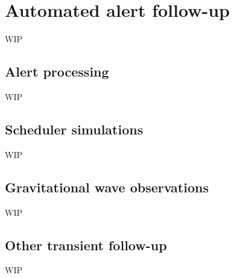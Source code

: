 
\newpage
\section{Automated alert follow-up}
\label{sec:followup}
\begin{colsection}


\begin{colsection}

WIP

\end{colsection}


\subsection{Alert processing}
\label{sec:alerts}
\begin{colsection}

WIP

\end{colsection}


\subsection{Scheduler simulations}
\label{sec:simulations}
\begin{colsection}

WIP

\end{colsection}


\subsection{Gravitational wave observations}
\label{sec:gw_followup}
\begin{colsection}

WIP

\end{colsection}


\subsection{Other transient follow-up}
\label{sec:other_followup}
\begin{colsection}

WIP

\end{colsection}


\end{colsection}

